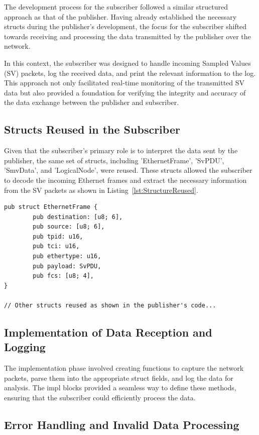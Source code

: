 The development process for the subscriber followed a similar structured approach as that of the publisher. Having already established the necessary structs during the publisher's development, the focus for the subscriber shifted towards receiving and processing the data transmitted by the publisher over the network.

In this context, the subscriber was designed to handle incoming Sampled Values (SV) packets, log the received data, and print the relevant information to the log. This approach not only facilitated real-time monitoring of the transmitted SV data but also provided a foundation for verifying the integrity and accuracy of the data exchange between the publisher and subscriber.

\subsection{Structs Reused in the Subscriber}

Given that the subscriber's primary role is to interpret the data sent by the publisher, the same set of structs, including 'EthernetFrame', 'SvPDU', 'SmvData', and 'LogicalNode', were reused. These structs allowed the subscriber to decode the incoming Ethernet frames and extract the necessary information from the SV packets as shown in Listing~\ref{lst:StructureReused}.

\begin{lstlisting}[breaklines=true, caption={Reused Structures.}, label={lst:StructureReused}]
	pub struct EthernetFrame {
		pub destination: [u8; 6],
		pub source: [u8; 6],
		pub tpid: u16,
		pub tci: u16,
		pub ethertype: u16,
		pub payload: SvPDU,
		pub fcs: [u8; 4],
}

// Other structs reused as shown in the publisher's code...
\end{lstlisting}

\subsection{Implementation of Data Reception and Logging}

The implementation phase involved creating functions to capture the network packets, parse them into the appropriate struct fields, and log the data for analysis. The impl blocks provided a seamless way to define these methods, ensuring that the subscriber could efficiently process the data.

\subsection{Error Handling and Invalid Data Processing}

